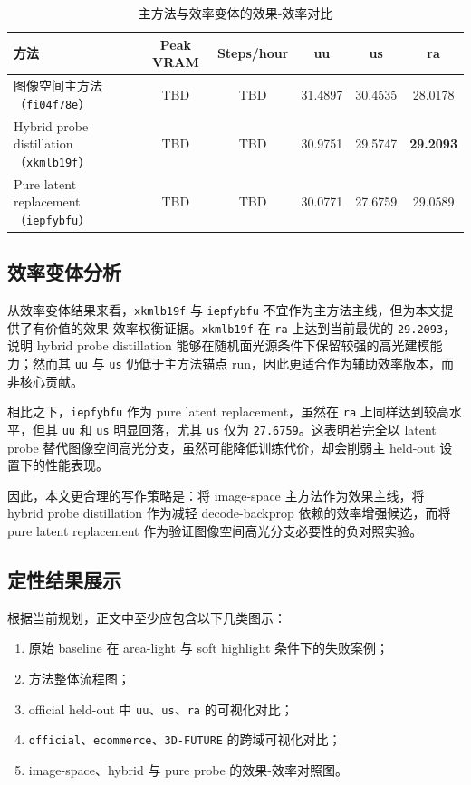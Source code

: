 \documentclass[UTF8,a4paper]{ctexart}
\begin{document}
\begin{table}[htbp]
\centering
\caption{主方法与效率变体的效果-效率对比}
\begin{tabular}{lccccc}
\toprule
方法 & Peak VRAM & Steps/hour & uu & us & ra \\
\midrule
图像空间主方法（\texttt{fi04f78e}） & TBD & TBD & 31.4897 & 30.4535 & 28.0178 \\
Hybrid probe distillation（\texttt{xkmlb19f}） & TBD & TBD & 30.9751 & 29.5747 & \textbf{29.2093} \\
Pure latent replacement（\texttt{iepfybfu}） & TBD & TBD & 30.0771 & 27.6759 & 29.0589 \\
\bottomrule
\end{tabular}
\end{table}

\subsection{效率变体分析}

从效率变体结果来看，\texttt{xkmlb19f} 与 \texttt{iepfybfu} 不宜作为主方法主线，但为本文提供了有价值的效果-效率权衡证据。\texttt{xkmlb19f} 在 \texttt{ra} 上达到当前最优的 \texttt{29.2093}，说明 hybrid probe distillation 能够在随机面光源条件下保留较强的高光建模能力；然而其 \texttt{uu} 与 \texttt{us} 仍低于主方法锚点 run，因此更适合作为辅助效率版本，而非核心贡献。

相比之下，\texttt{iepfybfu} 作为 pure latent replacement，虽然在 \texttt{ra} 上同样达到较高水平，但其 \texttt{uu} 和 \texttt{us} 明显回落，尤其 \texttt{us} 仅为 \texttt{27.6759}。这表明若完全以 latent probe 替代图像空间高光分支，虽然可能降低训练代价，却会削弱主 held-out 设置下的性能表现。

因此，本文更合理的写作策略是：将 image-space 主方法作为效果主线，将 hybrid probe distillation 作为减轻 decode-backprop 依赖的效率增强候选，而将 pure latent replacement 作为验证图像空间高光分支必要性的负对照实验。

\subsection{定性结果展示}

根据当前规划，正文中至少应包含以下几类图示：

\begin{enumerate}
\item 原始 baseline 在 area-light 与 soft highlight 条件下的失败案例；
\item 方法整体流程图；
\item official held-out 中 \texttt{uu}、\texttt{us}、\texttt{ra} 的可视化对比；
\item \texttt{official}、\texttt{ecommerce}、\texttt{3D-FUTURE} 的跨域可视化对比；
\item image-space、hybrid 与 pure probe 的效果-效率对照图。
\end{enumerate}
\end{document}

